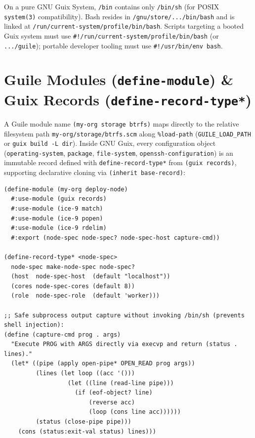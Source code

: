 \documentclass[11pt,oneside]{book}
\begin{document}
\begin{protrap}
On a pure GNU Guix System, \texttt{/bin} contains only \texttt{/bin/sh} (for POSIX \texttt{system(3)} compatibility). Bash resides in \texttt{/gnu/store/.../bin/bash} and is linked at \texttt{/run/current-system/profile/bin/bash}. Scripts targeting a booted Guix system must use \texttt{\#!/run/current-system/profile/bin/bash} (or \texttt{.../guile}); portable developer tooling must use \texttt{\#!/usr/bin/env bash}.
\end{protrap}

\section{Guile Modules (\texttt{define-module}) \& Guix Records (\texttt{define-record-type*})}

A Guile module name \texttt{(my-org storage btrfs)} maps directly to the relative filesystem path \texttt{my-org/storage/btrfs.scm} along \texttt{\%load-path} (\texttt{GUILE\_LOAD\_PATH} or \texttt{guix build -L dir}). Inside GNU Guix, every configuration object (\texttt{operating-system}, \texttt{package}, \texttt{file-system}, \texttt{openssh-configuration}) is an immutable record defined with \texttt{define-record-type*} from \texttt{(guix records)}, supporting declarative cloning via \texttt{(inherit base-record)}:

\begin{lstlisting}[language=GuileScheme]
(define-module (my-org deploy-node)
  #:use-module (guix records)
  #:use-module (ice-9 match)
  #:use-module (ice-9 popen)
  #:use-module (ice-9 rdelim)
  #:export (node-spec node-spec? node-spec-host capture-cmd))

(define-record-type* <node-spec>
  node-spec make-node-spec node-spec?
  (host  node-spec-host  (default "localhost"))
  (cores node-spec-cores (default 8))
  (role  node-spec-role  (default 'worker)))

;; Safe subprocess output capture without invoking /bin/sh (prevents shell injection):
(define (capture-cmd prog . args)
  "Execute PROG with ARGS directly via execvp and return (status . lines)."
  (let* ((pipe (apply open-pipe* OPEN_READ prog args))
         (lines (let loop ((acc '()))
                  (let ((line (read-line pipe)))
                    (if (eof-object? line)
                        (reverse acc)
                        (loop (cons line acc))))))
         (status (close-pipe pipe)))
    (cons (status:exit-val status) lines)))
\end{lstlisting}
\end{document}
